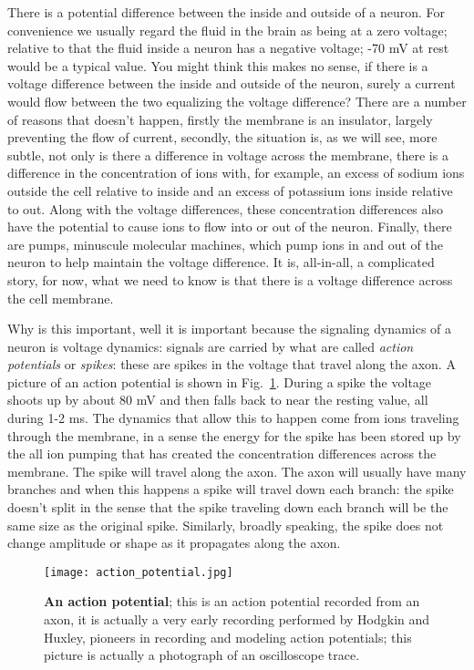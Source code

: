 \documentclass[12pt]{article}
\begin{document}
There is a potential difference between the inside and outside of a
neuron. For convenience we usually regard the fluid in the brain as
being at a zero voltage; relative to that the fluid inside a neuron
has a negative voltage; -70 mV at rest would be a typical value. You
might think this makes no sense, if there is a voltage difference
between the inside and outside of the neuron, surely a current would
flow between the two equalizing the voltage difference? There are a
number of reasons that doesn't happen, firstly the membrane is an
insulator, largely preventing the flow of current, secondly, the
situation is, as we will see, more subtle, not only is there a
difference in voltage across the membrane, there is a difference in
the concentration of ions with, for example, an excess of sodium ions
outside the cell relative to inside and an excess of potassium ions
inside relative to out. Along with the voltage differences, these
concentration differences also have the potential to cause ions to
flow into or out of the neuron. Finally, there are pumps, minuscule
molecular machines, which pump ions in and out of the neuron to help
maintain the voltage difference. It is, all-in-all, a complicated
story, for now, what we need to know is that there is a voltage
difference across the cell membrane.

Why is this important, well it is important because the signaling
dynamics of a neuron is voltage dynamics: signals are carried by what
are called \textsl{action potentials} or \textsl{spikes}: these are
spikes in the voltage that travel along the axon. A picture of an
action potential is shown in Fig.~\ref{fig_hh}. During a spike the voltage
shoots up by about 80 mV and then falls back to near the resting
value, all during 1-2 ms. The dynamics that allow this to happen come
from ions traveling through the membrane, in a sense the energy for
the spike has been stored up by the all ion pumping that has created
the concentration differences across the membrane. The spike will
travel along the axon. The axon will usually have many branches and
when this happens a spike will travel down each branch: the spike
doesn't split in the sense that the spike traveling down each branch
will be the same size as the original spike. Similarly, broadly
speaking, the spike does not change amplitude or shape as it
propagates along the axon.


\begin{figure}[tbhp]
  \begin{center}
  \texttt{[image: action\_potential.jpg]}
\end{center}
  \caption{\textbf{An action potential}; this is an action potential recorded from an axon, it is actually a very early recording performed by Hodgkin and Huxley, pioneers in recording and modeling action potentials; this picture is actually a photograph of an oscilloscope trace. \label{fig_hh}}
\end{figure}
\end{document}
